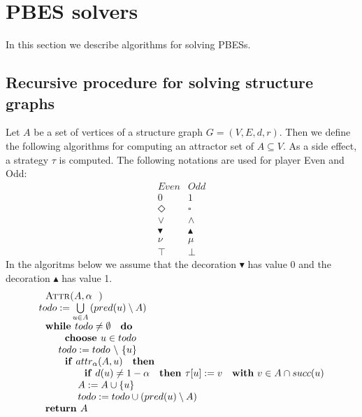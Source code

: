                      

\section{PBES solvers}

In this section we describe algorithms for solving PBESs.

\subsection{Recursive procedure for solving structure graphs}

Let $A$ be a set of vertices of a structure graph $G=(V,E,d,r)$. Then we
define the following algorithms for computing an attractor set of $%
A\subseteq V$. As a side effect, a strategy $\tau $ is computed. The
following notations are used for player Even and Odd:%
\begin{equation*}
\begin{array}{cc}
Even & Odd \\ 
0 & 1 \\ 
\Diamond  & \square  \\ 
\vee  & \wedge  \\ 
\blacktriangledown  & \blacktriangle  \\ 
\nu  & \mu  \\ 
\top  & \bot 
\end{array}%
\end{equation*}%
In the algoritms below we assume that the decoration $\blacktriangledown $
has value 0 and the decoration $\blacktriangle $ has value 1.%
\begin{equation*}
\begin{array}{l}
\text{\textsc{Attr(}}A,\alpha \text{\textsc{)}} \\ 
todo:=\bigcup\limits_{u\in A}\left( pred(u)\setminus A\right)  \\ 
\text{\textbf{while }}todo\neq \emptyset \text{ \textbf{do}} \\ 
\qquad \text{\textbf{choose }}u\in todo \\ 
\qquad todo:=todo\ \backslash \ \{u\} \\ 
\qquad \text{\textbf{if} }attr_{\alpha }(A,u)\text{ \textbf{then}} \\ 
\qquad \qquad \text{\textbf{if} }d(u)\neq 1 - \alpha \text{ \textbf{then }}\tau
\lbrack u]:=v\text{ \textbf{with} }v\in A\cap succ(u) \\ 
\qquad \qquad A:=A\cup \{u\} \\ 
\qquad \qquad todo:=todo\cup \left( pred(u)\setminus A\right)  \\ 
\text{\textbf{return }}A%
\end{array}%
\end{equation*}%

